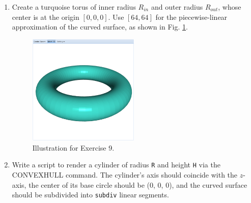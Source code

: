 \documentclass{article}
\begin{document}
\begin{enumerate}
\item Create a turquoise torus of inner radius $R_{in}$ and outer radius $R_{out}$, whose center 
is at the origin $[0, 0, 0]$. Use $[64, 64]$ for the piecewise-linear approximation 
of the curved surface, as shown in Fig. \ref{fig:a9}.


\begin{figure}[!ht]
\begin{center}
\includegraphics[width=0.5\textwidth]{img/a9-turquoise-torus.png}
\end{center}
\vspace{-2mm}
\caption{Illustration for Exercise 9.}
\label{fig:a9}
\end{figure}

\item Write a script to render a cylinder of radius {\tt R} and height {\tt H}
      via the CONVEXHULL command. The cylinder's axis should coincide with the 
      $z$-axis, the center of its base circle should be (0, 0, 0), and the 
      curved surface should be subdivided into {\tt subdiv} linear segments.

\end{enumerate}
\newpage
\end{document}

